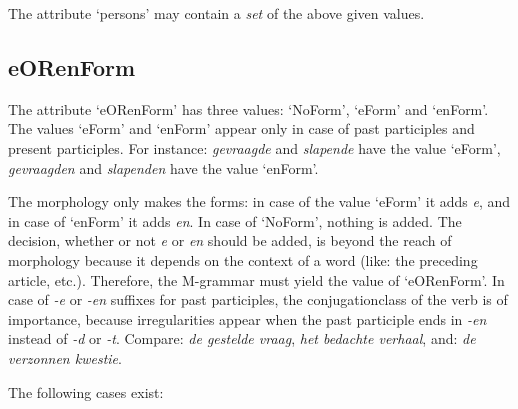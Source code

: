 The attribute `persons' may contain a {\em set} of the above given values.


\subsection{eORenForm}

The attribute `eORenForm' has three values: `NoForm', `eForm' and `enForm'.
The values `eForm' and `enForm' appear only in case of past participles and 
present participles. For instance: {\em gevraagde} and {\em slapende} have 
the value `eForm', {\em gevraagden} and {\em slapenden} have the value `enForm'.

The morphology only makes the forms: in case of the value `eForm' it
adds {\em e}, and in case of `enForm' it adds {\em en}. 
In case of `NoForm', nothing is added. The decision, whether or not 
{\em e} or {\em en} should be added, is beyond the reach of morphology because 
it depends on the context of a word (like: the 
preceding article, etc.). Therefore, the M-grammar must yield the value of
`eORenForm'. 
In case of {\em -e} or {\em -en} suffixes for past participles, 
the conjugationclass of the verb is of importance, because
irregularities appear when the past participle ends in {\em -en} instead of 
{\em -d} or {\em -t}. 
Compare: {\em de gesteld{\em e} vraag}, {\em het bedacht{\em e} verhaal}, and:
{\em de verzonnen kwestie}.
 
The following cases exist:


